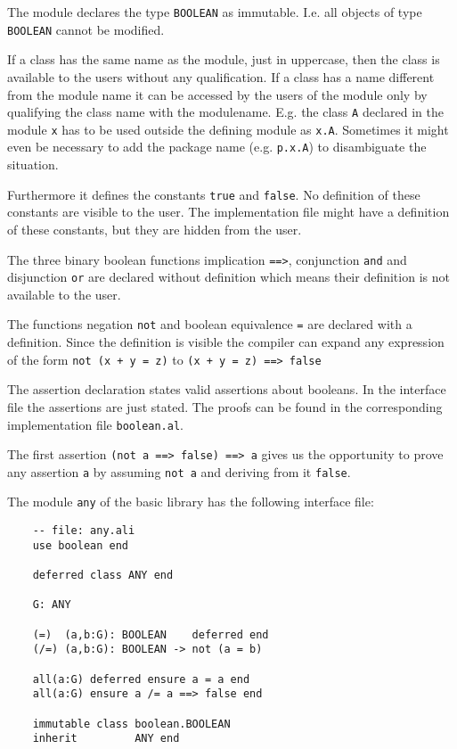 The module declares the type \lstinline!BOOLEAN! as immutable. I.e. all
objects of type \lstinline!BOOLEAN! cannot be modified.

If a class has the same name as the module, just in uppercase, then the class
is available to the users without any qualification. If a class has a name
different from the module name it can be accessed by the users of the module
only by qualifying the class name with the modulename. E.g. the class
\lstinline!A! declared in the module \lstinline!x! has to be used outside the
defining module as \lstinline!x.A!. Sometimes it might even be necessary to
add the package name (e.g. \lstinline!p.x.A!) to disambiguate the situation.

Furthermore it defines the constants \lstinline!true! and
\lstinline!false!. No definition of these constants are visible to the
user. The implementation file might have a definition of these constants, but
they are hidden from the user.

The three binary boolean functions implication \lstinline!==>!, conjunction
\lstinline!and! and disjunction \lstinline!or! are declared without definition
which means their definition is not available to the user.

The functions negation \lstinline!not! and boolean equivalence \lstinline!=!
are declared with a definition. Since the definition is visible the compiler
can expand any expression of the form \lstinline!not (x + y = z)! to
\lstinline!(x + y = z) ==> false!

The assertion declaration states valid assertions about booleans. In the
interface file the assertions are just stated. The proofs can be found in the
corresponding implementation file \lstinline!boolean.al!.

The first assertion \lstinline!(not a ==> false) ==> a! gives us the
opportunity to prove any assertion \lstinline!a! by assuming \lstinline!not a!
and deriving from it \lstinline!false!.


The module \lstinline!any! of the basic library has the following interface file:

\begin{lstlisting}
    -- file: any.ali
    use boolean end

    deferred class ANY end

    G: ANY

    (=)  (a,b:G): BOOLEAN    deferred end
    (/=) (a,b:G): BOOLEAN -> not (a = b)

    all(a:G) deferred ensure a = a end
    all(a:G) ensure a /= a ==> false end

    immutable class boolean.BOOLEAN
    inherit         ANY end
\end{lstlisting}

